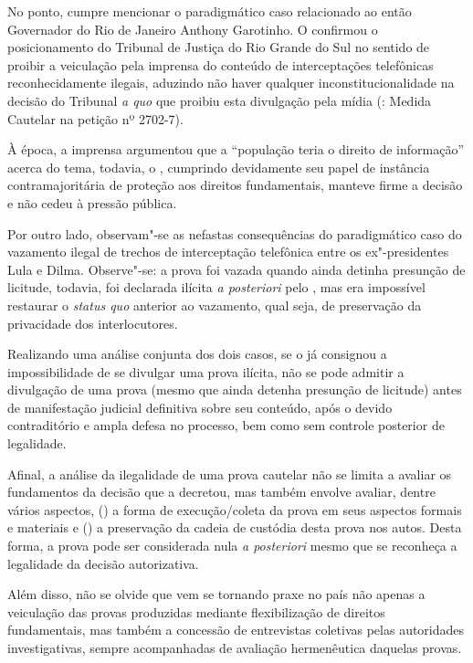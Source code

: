 No ponto, cumpre mencionar o paradigmático caso relacionado ao então
Governador do Rio de Janeiro Anthony Garotinho. O  confirmou o
posicionamento do Tribunal de Justiça do Rio Grande do Sul no sentido de
proibir a veiculação pela imprensa do conteúdo de interceptações
telefônicas reconhecidamente ilegais, aduzindo não haver qualquer
inconstitucionalidade na decisão do Tribunal \emph{a quo} que proibiu
esta divulgação pela mídia (: Medida Cautelar na petição nº 2702-7).

À época, a imprensa argumentou que a ``população teria o direito de
informação'' acerca do tema, todavia, o , cumprindo devidamente seu
papel de instância contramajoritária de proteção aos direitos
fundamentais, manteve firme a decisão e não cedeu à pressão pública.

Por outro lado, observam"-se as nefastas consequências do paradigmático
caso do vazamento ilegal de trechos de interceptação telefônica entre os
ex"-presidentes Lula e Dilma. Observe"-se: a prova foi vazada quando ainda
detinha presunção de licitude, todavia, foi declarada ilícita \emph{a
posteriori} pelo , mas era impossível restaurar o \emph{status quo}
anterior ao vazamento, qual seja, de preservação da privacidade dos
interlocutores.

Realizando uma análise conjunta dos dois casos, se o  já consignou a
impossibilidade de se divulgar uma prova ilícita, não se pode admitir a
divulgação de uma prova (mesmo que ainda detenha presunção de licitude)
antes de manifestação judicial definitiva sobre seu conteúdo, após o
devido contraditório e ampla defesa no processo, bem como sem controle
posterior de legalidade.

Afinal, a análise da ilegalidade de uma prova cautelar não se limita a
avaliar os fundamentos da decisão que a decretou, mas também envolve
avaliar, dentre vários aspectos, () a forma de execução/coleta da prova
em seus aspectos formais e materiais e () a preservação da cadeia de
custódia desta prova nos autos. Desta forma, a prova pode ser
considerada nula \emph{a posteriori} mesmo que se reconheça a legalidade
da decisão autorizativa.

Além disso, não se olvide que vem se tornando praxe no país não apenas a
veiculação das provas produzidas mediante flexibilização de direitos
fundamentais, mas também a concessão de entrevistas coletivas pelas
autoridades investigativas, sempre acompanhadas de avaliação
hermenêutica daquelas provas.

